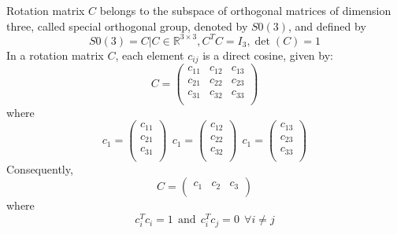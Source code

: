  Rotation matrix $C$ belongs to the subspace of orthogonal matrices of dimension three, called special orthogonal group, denoted by $S0(3)$, and defined by
 \begin{equation}\label{so3}
   S0(3)={C|C\in \mathbb{R}^{3\times3},C^TC=I_3,\det(C)=1}
 \end{equation}
 In a rotation matrix $C$, each element $c_{ij}$ is a direct cosine, given by:
 \begin{equation}\label{C}
   C=\left(
       \begin{array}{ccc}
         c_{11} & c_{12} & c_{13} \\
         c_{21} & c_{22} & c_{23} \\
         c_{31} & c_{32} & c_{33} \\
       \end{array}\right)
 \end{equation} where
 \begin{equation}\label{cij}
   c_1=\left(
         \begin{array}{c}
           c_{11} \\
           c_{21} \\
           c_{31} \\
         \end{array}\right)\ \ c_1=\left(
         \begin{array}{c}
           c_{12} \\
           c_{22} \\
           c_{32} \\
         \end{array}\right)\ \ c_1=\left(
         \begin{array}{c}
           c_{13} \\
           c_{23} \\
           c_{33} \\
         \end{array}\right)
 \end{equation}
 Consequently,
 \begin{equation}\label{C2}
   C=\left(
       \begin{array}{ccc}
         c_1 & c_2 & c_3 \\ \end{array}\right)
 \end{equation} where
 \begin{equation}
   c_i^Tc_i=1\ \ \textrm{and}\ \ c_i^Tc_j=0\ \ \forall i\neq j
 \end{equation}

